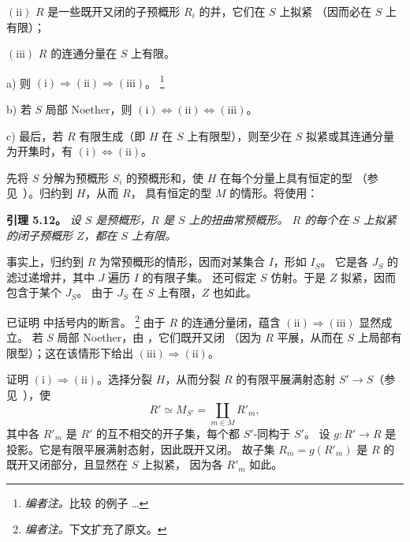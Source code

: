 \smallskip
\noindent
{}\(\mathrm{(ii)}\) \(R\) 是一些既开又闭的子预概形 \(R_i\) 的并，它们在 \(S\) 上拟紧
（因而必在 \(S\) 上有限）；

\smallskip
\noindent
\(\mathrm{(iii)}\) \(R\) 的连通分量在 \(S\) 上有限。

\smallskip
\noindent
a) 则 \(\mathrm{(i)}\Rightarrow\mathrm{(ii)}\Rightarrow\mathrm{(iii)}\)。
\footnote{\textit{编者注。}比较  的例子 \ldots}

\smallskip
\noindent
b) 若 \(S\) 局部 Noether，则
\(\mathrm{(i)}\Leftrightarrow\mathrm{(ii)}\Leftrightarrow\mathrm{(iii)}\)。

\smallskip
\noindent
c) 最后，若 \(R\) 有限生成（即 \(H\) 在 \(S\) 上有限型），则至少在
\(S\) 拟紧或其连通分量为开集时，有 \(\mathrm{(i)}\Leftrightarrow\mathrm{(ii)}\)。
\par\endgroup

先将 \(S\) 分解为预概形 \(S_i\) 的预概形和，使 \(H\) 在每个分量上具有恒定的型
（参见\ ）。归约到 \(H\)，从而 \(R\)，
具有恒定的型 \(M\) 的情形。将使用：

\par\medskip\noindent
\textbf{引理 5.12。}\enspace
\emph{设 \(S\) 是预概形，\(R\) 是 \(S\) 上的扭曲常预概形。
\(R\) 的每个在 \(S\) 上拟紧的闭子预概形 \(Z\)，都在 \(S\) 上有限。}

事实上，归约到 \(R\) 为常预概形的情形，因而对某集合 \(I\)，形如 \(I_S\)。
它是各 \(J_S\) 的滤过递增并，其中 \(J\) 遍历 \(I\) 的有限子集。
还可假定 \(S\) 仿射。于是 \(Z\) 拟紧，因而包含于某个 \(J_S\)。
由于 \(J_S\) 在 \(S\) 上有限，\(Z\) 也如此。

 已证明
 中括号内的断言。
\footnote{\textit{编者注。}下文扩充了原文。}
由于 \(R\) 的连通分量闭，蕴含 \(\mathrm{(ii)}\Rightarrow\mathrm{(iii)}\) 显然成立。
若 \(S\) 局部 Noether，由 ，它们既开又闭
（因为 \(R\) 平展，从而在 \(S\) 上局部有限型）；这在该情形下给出
\(\mathrm{(iii)}\Rightarrow\mathrm{(ii)}\)。

证明 \(\mathrm{(i)}\Rightarrow\mathrm{(ii)}\)。选择分裂 \(H\)，从而分裂 \(R\)
的有限平展满射态射 \(S'\to S\)（参见\ ），使
\[
  R'\simeq M_{S'}=\coprod_{m\in M}R'_m,
\]
其中各 \(R'_m\) 是 \(R'\) 的互不相交的开子集，每个都 \(S'\)-同构于 \(S'\)。
设 \(g:R'\to R\) 是投影。它是有限平展满射态射，因此既开又闭。
故子集 \(R_m=g(R'_m)\) 是 \(R\) 的既开又闭部分，且显然在 \(S\) 上拟紧，
因为各 \(R'_m\) 如此。

